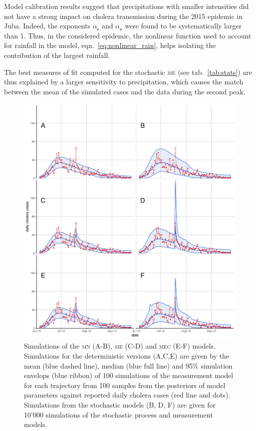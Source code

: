 Model calibration results suggest that precipitations with smaller intensities did not have a strong impact on cholera transmission during the 2015 epidemic in Juba. Indeed, the exponents $\alpha_{\mathcal{c}}$ and $\alpha_{\mathcal{e}}$ were found to be systematically larger than 1. %
  Thus, in the considered epidemic, the nonlinear function used to account for rainfall in the model, eqn.~\eqref{eq:nonlinear_rain}, helps isolating the contribution of the largest rainfall.

The best measures of fit computed for the stochastic \textsc{me} (see tab.~\ref{tab:stats}) are thus explained by a larger sensitivity to precipitation, which causes the match between the mean of the simulated cases and the data during the second peak.

\begin{figure}[ht]
    \centering
    \includegraphics{fig_cholera-rainfall/Lemaitre_ACTROP_2018_42_R1_fig4.png}
    \caption[Fit of the different models]{Simulations of the \textsc{mn} (A-B), \textsc{me} (C-D) and \textsc{mec} (E-F) models. Simulations for the deterministic versions (A,C,E) are given by the mean (blue dashed line), median (blue full line) and 95\% simulation envelops (blue ribbon) of 100 simulations of the measurement model for each trajectory from 100 samples from the posteriors of model parameters against reported daily cholera cases (red line and dots). Simulations from the stochastic models (B, D, F) are given for 10'000 simulations of the stochastic process and measurement models.}
    \label{fig:sim}
\end{figure}

